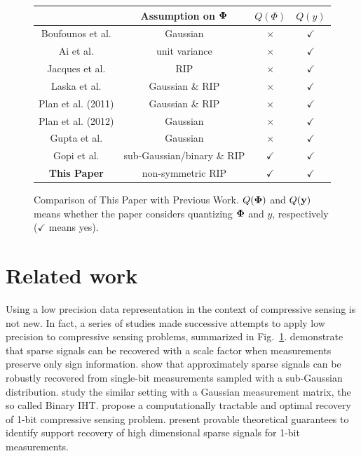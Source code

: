 \documentclass{article}
\begin{document}
\begin{figure}[t]
\small
\centering
\begin{tabular}{c|c|cc}
\hline
                   & Assumption on ${\bf \Phi}$ & $Q(\Phi)$ & $Q(y)$ \\
\hline
 Boufounos et al.
 & Gaussian  &$\times$ & $\checkmark$\\
 Ai et al.         & unit variance &$\times$ & $\checkmark$\\
 Jacques et al.     &  RIP & $\times$& $\checkmark$\\
 Laska et al.     & Gaussian \& RIP &$\times$ & $\checkmark$\\
 Plan et al. (2011)     & Gaussian \& RIP &$\times$ & $\checkmark$\\
 Plan et al. (2012)      & Gaussian &$\times$ & $\checkmark$\\
 Gupta et al.     & Gaussian &$\times$ & $\checkmark$\\
 Gopi et al.       & sub-Gaussian/binary \& RIP &$\checkmark$ & $\checkmark$\\
\hline
  {\bf This Paper}                & non-symmetric RIP & $\checkmark$ & $\checkmark$ \\
\hline
\end{tabular}
\caption{Comparison of This Paper with Previous Work. $Q({\bf \Phi})$ and $Q({\bf y})$ means whether
the paper considers quantizing ${\bf \Phi}$ and $y$,
respectively ($\checkmark$ means yes).}
\label{tab:cs}
\end{figure}



\section{Related work}\label{section_related_work}

Using a low precision data representation in the context of compressive sensing
is not new. In fact, a series of studies made successive attempts to apply low precision  
to compressive sensing problems, summarized in
Fig.~\ref{tab:cs}. \cite{boufounos20091bitcs} demonstrate that sparse signals can be recovered with a scale factor when measurements preserve only sign information. \cite{ai20121bitcs, davenport20121bit} show that approximately sparse signals can be robustly recovered from single-bit measurements sampled with a sub-Gaussian distribution. \cite{jacques20111bit, laska20111bitcs} study the similar setting with a Gaussian measurement matrix, the so called Binary IHT. \cite{plan20111bitcs, plan20121bitcs} propose a computationally tractable and optimal recovery of 1-bit compressive sensing problem. \cite{recht20121bitcs, gopi20131bitcs} present provable theoretical guarantees to identify support recovery of high dimensional sparse signals for 1-bit measurements. 
\end{document}
